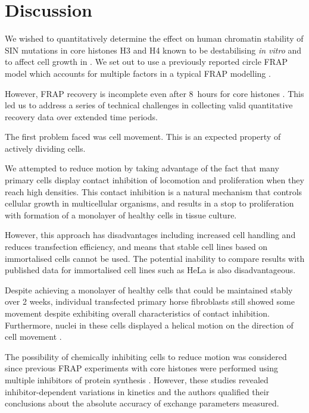 \section{Discussion}

    We wished to quantitatively determine the
    effect on human chromatin stability
    of SIN mutations in core histones H3 and H4 known
    to be destabilising \textit{in vitro} and to affect
    cell growth in .
    We set out to use a previously reported circle FRAP model
    which accounts for multiple factors in a typical
    FRAP modelling \citep{mcnally-frap-code}.

    However, FRAP recovery is incomplete even
    after 8~hours for core histones \citep{KimuraCook}.
    This led us to address a series of technical challenges in
    collecting valid quantitative recovery data over extended time periods.


    The first problem faced was cell movement.
    This is an expected property of actively dividing cells.

    We attempted to reduce motion by taking advantage of
    the fact that many primary cells display contact inhibition of
    locomotion and proliferation when they reach high densities.
    This contact inhibition is a natural mechanism
    that controls cellular growth in
    multicellular organisms, and results in a stop to proliferation
    with formation of a monolayer of healthy cells in tissue culture.

    However, this approach has disadvantages including
    increased cell handling and reduces transfection efficiency,
    and means that stable cell lines based on
    immortalised cells cannot be used.
    The potential inability to compare results with published data for
    immortalised cell lines such as HeLa is also disadvantageous.

    Despite achieving a monolayer of healthy cells that
    could be maintained stably over 2 weeks,
    individual transfected primary horse fibroblasts still showed some movement
    despite exhibiting overall characteristics of contact inhibition.
    Furthermore, nuclei in these cells displayed a helical motion
    on the direction of cell movement .

    The possibility of chemically inhibiting
    cells to reduce motion was considered
    since previous FRAP experiments with core
    histones were performed using multiple inhibitors
    of protein synthesis \citep{KimuraCook}. However, these studies revealed
    inhibitor-dependent variations in kinetics and the authors qualified
    their conclusions about the absolute accuracy
    of exchange parameters measured.

